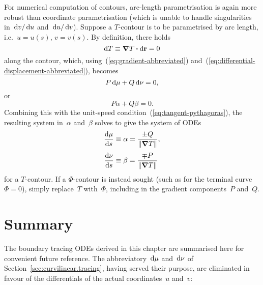 For numerical computation of contours,
arc-length parametrisation is again more robust
than coordinate parametrisation
(which is unable to handle singularities
in~$\mathop{}\!\mathrm{d} v / \mathop{}\!\mathrm{d} u$ and~$\mathop{}\!\mathrm{d} u / \mathop{}\!\mathrm{d} v$).
Suppose a $T$-contour is to be parametrised by arc length,
i.e.~$u = u (s)$, $v = v(s)$.
By definition, there holds
\[
  \mathop{}\!\mathrm{d} T \equiv \mathop{}\!\boldsymbol{\mathrm{\nabla}} T \boldsymbol{\cdot} \mathop{}\!\mathrm{d} \boldsymbol{\mathrm{r}} = 0
\]
along the contour,
which, using~(\ref{eq:gradient-abbreviated})
and~(\ref{eq:differential-displacement-abbreviated}),
becomes
\[
  P \mathop{}\!\mathrm{d} \mu + Q \mathop{}\!\mathrm{d} \nu = 0,
\]
or
\begin{equation}
  P \alpha + Q \beta = 0.
  \label{eq:contour-arc-length-parametrisation-contour}
\end{equation}
Combining this with the unit-speed condition~(\ref{eq:tangent-pythagoras}),
the resulting system in~$\alpha$ and~$\beta$
solves to give the system of ODEs
\begin{align}
  \tder{\mu}{s} &\defeq \alpha = \frac{\pm Q}{\norm{\del T}},
    \label{eq:contour-ode-arc-length-parametrisation-mu} \\[\fraclinespace]
  \tder{\nu}{s} &\defeq \beta = \frac{\mp P}{\norm{\del T}}
    \label{eq:contour-ode-arc-length-parametrisation-nu}
\end{align}
for a $T$-contour.
If a $\Phi$-contour is instead sought
(such as for the terminal curve~$\Phi = 0$),
simply replace~$T$ with~$\Phi$,
including in the gradient components~$P$ and~$Q$.

\section{Summary}
\label{sec:curvilinear.summary}

The boundary tracing ODEs derived in this chapter
are summarised here for convenient future reference.
The abbreviatory~$\mathop{}\!\mathrm{d} \mu$ and~$\mathop{}\!\mathrm{d} \nu$
of Section~\ref{sec:curvilinear.tracing},
having served their purpose,
are eliminated in favour of the differentials
of the actual coordinates~$u$ and~$v$:
